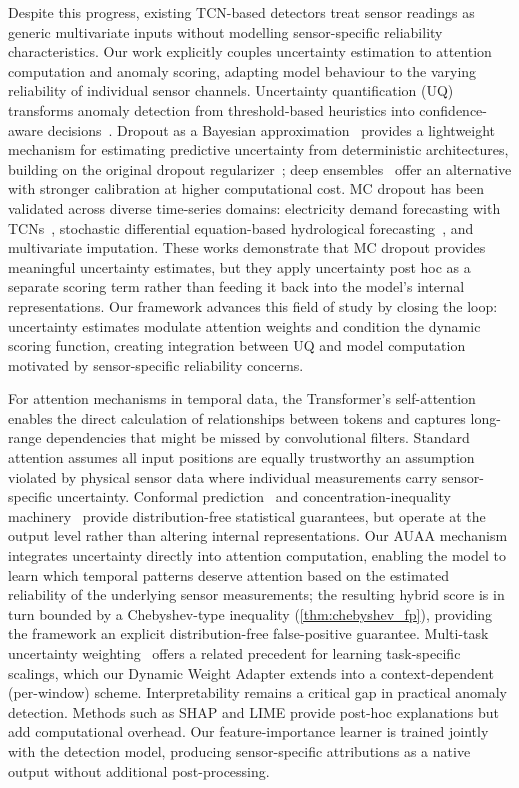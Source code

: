 Despite this progress, existing TCN-based detectors treat sensor readings as generic multivariate inputs without modelling sensor-specific reliability characteristics. Our work explicitly couples uncertainty estimation to attention computation and anomaly scoring, adapting model behaviour to the varying reliability of individual sensor channels. Uncertainty quantification (UQ) transforms anomaly detection from threshold-based heuristics into confidence-aware decisions~\cite{kendall2017uncertainties}. Dropout as a Bayesian approximation~\cite{gal2016dropout_bayesian} provides a lightweight mechanism for estimating predictive uncertainty from deterministic architectures, building on the original dropout regularizer~\cite{srivastava2014dropout}; deep ensembles~\cite{lakshminarayanan2017ensembles} offer an alternative with stronger calibration at higher computational cost. MC dropout has been validated across diverse time-series domains: electricity demand forecasting with TCNs~\cite{ghimire_electricity_2025}, stochastic differential equation-based hydrological forecasting~\cite{cui_sde-hnn_2025}, and multivariate imputation. These works demonstrate that MC dropout provides meaningful uncertainty estimates, but they apply uncertainty post hoc as a separate scoring term rather than feeding it back into the model's internal representations. Our framework advances this field of study by closing the loop: uncertainty estimates modulate attention weights and condition the dynamic scoring function, creating integration between UQ and model computation motivated by sensor-specific reliability concerns.

For attention mechanisms in temporal data, the Transformer's self-attention~\cite{vaswani2017attention} enables the direct calculation of relationships between tokens and captures long-range dependencies that might be missed by convolutional filters. Standard attention assumes all input positions are equally trustworthy an assumption violated by physical sensor data where individual measurements carry sensor-specific uncertainty. Conformal prediction~\cite{angelopoulos2021conformal} and concentration-inequality machinery~\cite{boucheron2013concentration} provide distribution-free statistical guarantees, but operate at the output level rather than altering internal representations. Our AUAA mechanism integrates uncertainty directly into attention computation, enabling the model to learn which temporal patterns deserve attention based on the estimated reliability of the underlying sensor measurements; the resulting hybrid score is in turn bounded by a Chebyshev-type inequality (\cref{thm:chebyshev_fp}), providing the framework an explicit distribution-free false-positive guarantee. Multi-task uncertainty weighting~\cite{kendall2018multitask} offers a related precedent for learning task-specific scalings, which our Dynamic Weight Adapter extends into a context-dependent (per-window) scheme. Interpretability remains a critical gap in practical anomaly detection. Methods such as SHAP and LIME provide post-hoc explanations but add computational overhead. Our feature-importance learner is trained jointly with the detection model, producing sensor-specific attributions as a native output without additional post-processing.

